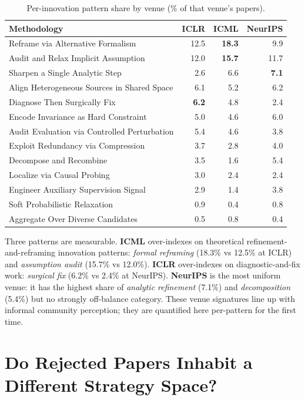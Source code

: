 \documentclass[10pt,a4paper]{article}
\begin{document}
\begin{table}[H]
\centering
\caption{Per-innovation pattern share by venue (\% of that venue's papers).}
\label{tab:venue}
\small
\begin{tabular}{p{6.5cm} rrr}
\toprule
\textbf{Methodology} & \textbf{ICLR} & \textbf{ICML} & \textbf{NeurIPS} \\
\midrule
Reframe via Alternative Formalism & 12.5 & \textbf{18.3} &  9.9 \\
Audit and Relax Implicit Assumption & 12.0 & \textbf{15.7} & 11.7 \\
Sharpen a Single Analytic Step &  2.6 &  6.6 & \textbf{7.1} \\
Align Heterogeneous Sources in Shared Space &  6.1 &  5.2 & 6.2 \\
Diagnose Then Surgically Fix &  \textbf{6.2} &  4.8 &  2.4 \\
Encode Invariance as Hard Constraint &  5.0 &  4.6 &  6.0 \\
Audit Evaluation via Controlled Perturbation &  5.4 &  4.6 &  3.8 \\
Exploit Redundancy via Compression &  3.7 &  2.8 &  4.0 \\
Decompose and Recombine &  3.5 &  1.6 &  5.4 \\
Localize via Causal Probing &  3.0 &  2.4 &  2.4 \\
Engineer Auxiliary Supervision Signal &  2.9 &  1.4 &  3.8 \\
Soft Probabilistic Relaxation &  0.9 &  0.4 &  0.8 \\
Aggregate Over Diverse Candidates &  0.5 &  0.8 &  0.4 \\
\bottomrule
\end{tabular}
\end{table}

Three patterns are measurable. \textbf{ICML} over-indexes on theoretical refinement-and-reframing innovation patterns: \emph{formal reframing} (18.3\% vs 12.5\% at ICLR) and \emph{assumption audit} (15.7\% vs 12.0\%). \textbf{ICLR} over-indexes on diagnostic-and-fix work: \emph{surgical fix} (6.2\% vs 2.4\% at NeurIPS). \textbf{NeurIPS} is the most uniform venue: it has the highest share of \emph{analytic refinement} (7.1\%) and \emph{decomposition} (5.4\%) but no strongly off-balance category. These venue signatures line up with informal community perception; they are quantified here per-pattern for the first time.


\section{Do Rejected Papers Inhabit a Different Strategy Space?}
\label{sec:reject}
\end{document}
